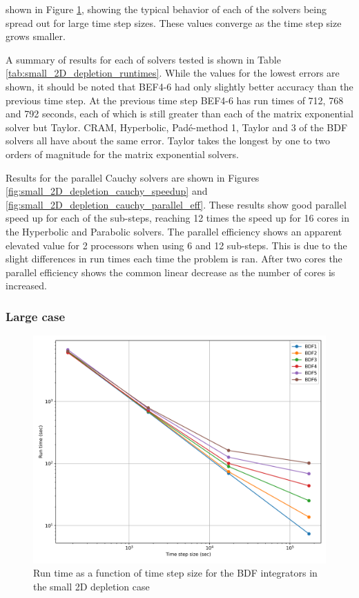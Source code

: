 \clearpage

\noindent shown in Figure \ref{fig:small_2D_depletion_integrator_runtimes}, showing the typical behavior of each of the solvers being spread out for large time step sizes. These values converge as the time step size grows smaller. 

A summary of results for each of solvers tested is shown in Table \ref{tab:small_2D_depletion_runtimes}. While the values for the lowest errors are shown, it should be noted that BEF4-6 had only slightly better accuracy than the previous time step. At the previous time step BEF4-6 has run times of 712, 768 and 792 seconds, each of which is still greater than each of the matrix exponential solver but Taylor. CRAM, Hyperbolic, Pad\'e-method 1, Taylor and 3 of the BDF solvers all have about the same error. Taylor takes the longest by one to two orders of magnitude for the matrix exponential solvers. 

Results for the parallel Cauchy solvers are shown in Figures \ref{fig:small_2D_depletion_cauchy_speedup} and \ref{fig:small_2D_depletion_cauchy_parallel_eff}. These results show good parallel speed up for each of the sub-steps, reaching 12 times the speed up for 16 cores in the Hyperbolic and Parabolic solvers. The parallel efficiency shows an apparent elevated value for 2 processors when using 6 and 12 sub-steps. This is due to the slight differences in run times each time the problem is ran. After two cores the parallel efficiency shows the common linear decrease as the number of cores is increased. 

\subsubsection{Large case}


\clearpage

\begin{figure}[p]
    \centering
    \includegraphics[width=5in]{images/chapter-5/caseStudies/small2DDepletion/msr2DDepletionSmallIntegratorRuntimes.png}
    \caption{Run time as a function of time step size for the BDF integrators in the small 2D depletion case}
    \label{fig:small_2D_depletion_integrator_runtimes}
\end{figure}

